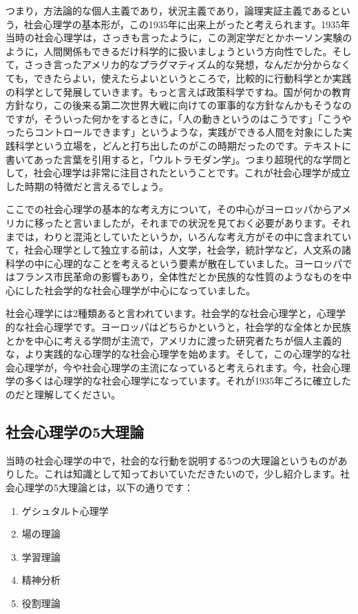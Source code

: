 \documentclass{ltjsbook}
\begin{document}
つまり，方法論的な個人主義であり，状況主義であり，論理実証主義であるという，社会心理学の基本形が，この1935年に出来上がったと考えられます。1935年当時の社会心理学は，さっきも言ったように，この測定学だとかホーソン実験のように，人間関係もできるだけ科学的に扱いましょうという方向性でした。そして，さっき言ったアメリカ的なプラグマティズム的な発想，なんだか分からなくても，できたらよい，使えたらよいというところで，比較的に行動科学とか実践の科学として発展していきます。もっと言えば政策科学ですね。国が何かの教育方針なり，この後来る第二次世界大戦に向けての軍事的な方針なんかもそうなのですが，そういった何かをするときに，「人の動きというのはこうです」「こうやったらコントロールできます」というような，実践ができる人間を対象にした実践科学という立場を，どんと打ち出したのがこの時期だったのです。テキストに書いてあった言葉を引用すると，「ウルトラモダン学」。つまり超現代的な学問として，社会心理学は非常に注目されたということです。これが社会心理学が成立した時期の特徴だと言えるでしょう。

ここでの社会心理学の基本的な考え方について，その中心がヨーロッパからアメリカに移ったと言いましたが，それまでの状況を見ておく必要があります。それまでは，わりと混沌としていたというか，いろんな考え方がその中に含まれていて，社会心理学として独立する前は，人文学，社会学，統計学など，人文系の諸科学の中に心理的なことを考えるという要素が散在していました。ヨーロッパではフランス市民革命の影響もあり，全体性だとか民族的な性質のようなものを中心にした社会学的な社会心理学が中心になっていました。

社会心理学には2種類あると言われています。社会学的な社会心理学と，心理学的な社会心理学です。ヨーロッパはどちらかというと，社会学的な全体とか民族とかを中心に考える学問が主流で，アメリカに渡った研究者たちが個人主義的な，より実践的な心理学的な社会心理学を始めます。そして，この心理学的な社会心理学が，今や社会心理学の主流になっていると考えられます。今，社会心理学の多くは心理学的な社会心理学になっています。それが1935年ごろに確立したのだと理解してください。

\subsection{社会心理学の5大理論}
当時の社会心理学の中で，社会的な行動を説明する5つの大理論というものがありした。これは知識として知っておいていただきたいので，少し紹介します。社会心理学の5大理論とは，以下の通りです：
\begin{enumerate}
    \item ゲシュタルト心理学
    \item 場の理論
    \item 学習理論
    \item 精神分析
    \item 役割理論
\end{enumerate}
\end{document}
